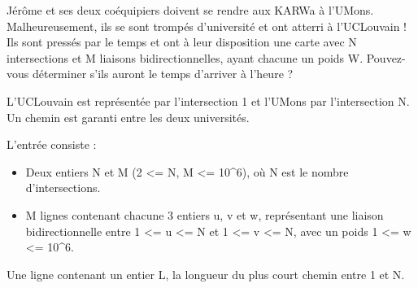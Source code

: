 \problemname{\problemyamlname}



Jérôme et ses deux coéquipiers doivent se rendre aux KARWa à l'UMons. Malheureusement, ils se sont trompés d'université et ont atterri à l'UCLouvain !
Ils sont pressés par le temps et ont à leur disposition une carte avec N intersections et M liaisons bidirectionnelles, ayant chacune un poids W.
Pouvez-vous déterminer s'ils auront le temps d'arriver à l'heure ?

L'UCLouvain est représentée par l'intersection 1 et l'UMons par l'intersection N. Un chemin est garanti entre les deux universités.

\begin{Input}
    L'entrée consiste :
    \begin{itemize}
        \item Deux entiers N et M (2 <= N, M <= 10^6), où N est le nombre d'intersections.
        \item  M lignes contenant chacune 3 entiers u, v et w, représentant une liaison bidirectionnelle entre 1 <= u <= N et 1 <= v <= N, avec un poids 1 <= w <= 10^6.
    \end{itemize}
\end{Input}

\begin{Output}
    Une ligne contenant un entier L, la longueur du plus court chemin entre 1 et N.
\end{Output}

